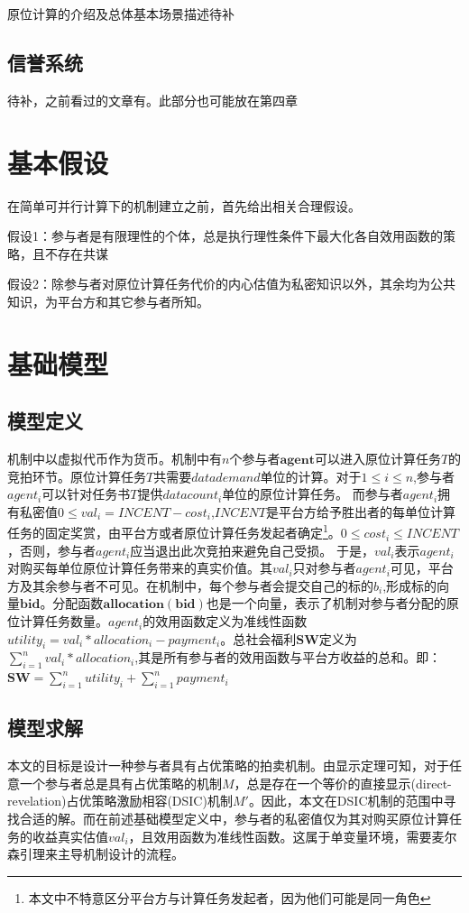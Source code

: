 \documentclass[promaster]{thesis-uestc}
\begin{document}
原位计算的介绍及总体基本场景描述待补

\subsection{信誉系统}
待补，之前看过的文章有。此部分也可能放在第四章

\section{基本假设}
在简单可并行计算下的机制建立之前，首先给出相关合理假设。

假设1：参与者是有限理性的个体，总是执行理性条件下最大化各自效用函数的策略，且不存在共谋

假设2：除参与者对原位计算任务代价的内心估值为私密知识以外，其余均为公共知识，为平台方和其它参与者所知。

\section{基础模型}

\subsection{模型定义}
\label{jichumoxingdingyi}

机制中以虚拟代币作为货币。机制中有$n$个参与者$\mathbf{agent}$可以进入原位计算任务$T$的竞拍环节。原位计算任务$T$共需要$datademand$单位的计算。对于$1\leq i\leq n$,参与者$agent_i$可以针对任务书$T$提供$datacount_i$单位的原位计算任务。
而参与者$agent_i$拥有私密值$0 \leq val_i = INCENT-cost_i$,$INCENT$是平台方给予胜出者的每单位计算任务的固定奖赏，由平台方或者原位计算任务发起者确定\footnote{本文中不特意区分平台方与计算任务发起者，因为他们可能是同一角色}。$0 \leq cost_i \leq INCENT$，否则，参与者$agent_i$应当退出此次竞拍来避免自己受损。 于是，$val_i$表示$agent_i$对购买每单位原位计算任务带来的真实价值。其$val_i$只对参与者$agent_i$可见，平台方及其余参与者不可见。在机制中，每个参与者会提交自己的标的$b_i$,形成标的向量$\mathbf{bid}$。分配函数$\mathbf{allocation}(\mathbf{bid})$也是一个向量，表示了机制对参与者分配的原位计算任务数量。$agent_i$的效用函数定义为准线性函数$utility_i = val_i*allocation_i-payment_i$。总社会福利$\mathbf{SW}$定义为$\sum_{i=1}^n{val_i*allocation_i}$,其是所有参与者的效用函数与平台方收益的总和。即：$\mathbf{SW} = \sum_{i=1}^n{utility_i}+\sum_{i=1}^{n}{payment_i}$

\subsection{模型求解}
本文的目标是设计一种参与者具有占优策略的拍卖机制。由显示定理可知，对于任意一个参与者总是具有占优策略的机制$M$，总是存在一个等价的直接显示(direct-revelation)占优策略激励相容(DSIC)机制$M'$。因此，本文在DSIC机制的范围中寻找合适的解。而在前述基础模型定义中，参与者的私密值仅为其对购买原位计算任务的收益真实估值$val_i$，且效用函数为准线性函数。这属于单变量环境，需要麦尔森引理来主导机制设计的流程。
\end{document}
